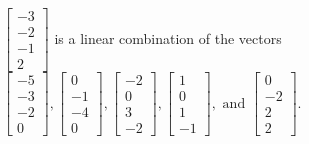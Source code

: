 \begin{exercise}
\begin{exerciseStatement}
  \end{exerciseStatement}
  \begin{exerciseAnswer}
   \(\left[\begin{array}{c}
-3 \\
-2 \\
-1 \\
2
\end{array}\right]\) 
  	 is  
	a linear combination of the vectors \(\left[\begin{array}{c}
-5 \\
-3 \\
-2 \\
0
\end{array}\right] , \left[\begin{array}{c}
0 \\
-1 \\
-4 \\
0
\end{array}\right] , \left[\begin{array}{c}
-2 \\
0 \\
3 \\
-2
\end{array}\right] , \left[\begin{array}{c}
1 \\
0 \\
1 \\
-1
\end{array}\right] , \text{ and } \left[\begin{array}{c}
0 \\
-2 \\
2 \\
2
\end{array}\right]\).

	
  


  \end{exerciseAnswer}
\end{exercise}